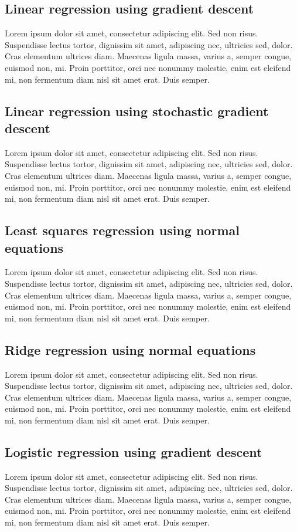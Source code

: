 \documentclass[10pt,conference,compsocconf]{IEEEtran}
\begin{document}
\subsection{Linear regression using gradient descent}
Lorem ipsum dolor sit amet, consectetur adipiscing elit. Sed non risus. Suspendisse lectus tortor, dignissim sit amet, adipiscing nec, ultricies sed, dolor. Cras elementum ultrices diam. Maecenas ligula massa, varius a, semper congue, euismod non, mi. Proin porttitor, orci nec nonummy molestie, enim est eleifend mi, non fermentum diam nisl sit amet erat. Duis semper. 

\subsection{Linear regression using stochastic gradient descent}
Lorem ipsum dolor sit amet, consectetur adipiscing elit. Sed non risus. Suspendisse lectus tortor, dignissim sit amet, adipiscing nec, ultricies sed, dolor. Cras elementum ultrices diam. Maecenas ligula massa, varius a, semper congue, euismod non, mi. Proin porttitor, orci nec nonummy molestie, enim est eleifend mi, non fermentum diam nisl sit amet erat. Duis semper. 

\subsection{Least squares regression using normal equations}
Lorem ipsum dolor sit amet, consectetur adipiscing elit. Sed non risus. Suspendisse lectus tortor, dignissim sit amet, adipiscing nec, ultricies sed, dolor. Cras elementum ultrices diam. Maecenas ligula massa, varius a, semper congue, euismod non, mi. Proin porttitor, orci nec nonummy molestie, enim est eleifend mi, non fermentum diam nisl sit amet erat. Duis semper. 

\subsection{Ridge regression using normal equations}
Lorem ipsum dolor sit amet, consectetur adipiscing elit. Sed non risus. Suspendisse lectus tortor, dignissim sit amet, adipiscing nec, ultricies sed, dolor. Cras elementum ultrices diam. Maecenas ligula massa, varius a, semper congue, euismod non, mi. Proin porttitor, orci nec nonummy molestie, enim est eleifend mi, non fermentum diam nisl sit amet erat. Duis semper. 

\subsection{Logistic regression using gradient descent}
Lorem ipsum dolor sit amet, consectetur adipiscing elit. Sed non risus. Suspendisse lectus tortor, dignissim sit amet, adipiscing nec, ultricies sed, dolor. Cras elementum ultrices diam. Maecenas ligula massa, varius a, semper congue, euismod non, mi. Proin porttitor, orci nec nonummy molestie, enim est eleifend mi, non fermentum diam nisl sit amet erat. Duis semper. 
\end{document}
